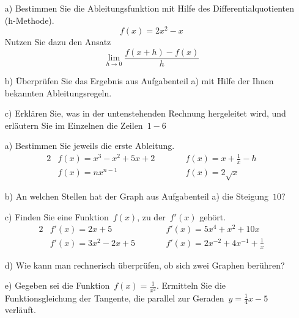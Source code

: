 	\begin{itemize}
		\item[a)] Bestimmen Sie die Ableitungsfunktion mit Hilfe des Differentialquotienten (h-Methode).
		\begin{equation*}
			f(x)= 2x^2 - x
		\end{equation*}
		Nutzen Sie dazu den Ansatz
		\begin{equation*}
			\lim\limits_{h \to 0} \frac{f(x+h)-f(x)}{h}
		\end{equation*}
		\item[b)] Überprüfen Sie das Ergebnis aus Aufgabenteil a) mit Hilfe der Ihnen bekannten Ableitungsregeln.
		\item[c)] Erklären Sie, was in der untenstehenden Rechnung hergeleitet wird, und erläutern Sie im Einzelnen die Zeilen~$1-6$
		
		\centering
	\end{itemize}
	\begin{itemize}
		\item[a)] Bestimmen Sie jeweils die erste Ableitung.
		\begin{alignat*}{2}
			&f(x)= x^3 - x^2 + 5x + 2 \qquad &&f(x)= x + \frac{1}{x} - h\\
			&f(x)= nx^{n-1} &&f(x)= 2 \sqrt{x}
		\end{alignat*}
		\item[b)] An welchen Stellen hat der Graph aus Aufgabenteil a) die Steigung~$10$?
		\item[c)] Finden Sie eine Funktion~$f(x)$, zu der~$f'(x)$ gehört.
		\begin{alignat*}{2}
			&f'(x)= 2x + 5 &&f'(x)= 5x^4 + x^2 + 10x\\
			&f'(x)= 3x^2 - 2x + 5 \qquad &&f'(x)= 2x^{-2} + 4x^{-1} + \frac{1}{x}
		\end{alignat*}
		\item[d)] Wie kann man rechnerisch überprüfen, ob sich zwei Graphen berühren?
		\item[e)] Gegeben sei die Funktion~$f(x)=\frac{1}{x^2}$. Ermitteln Sie die Funktionsgleichung der Tangente, die parallel zur Geraden~$y=\frac{1}{4}x-5$ verläuft.
	\end{itemize}
